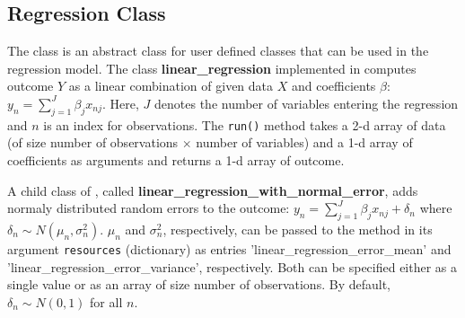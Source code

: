 \subsection{Regression Class}
\label{sec:regression}

The  class is an abstract class for user defined classes
that can be used in the regression model. The class {\bf linear_regression} 
 
implemented in  computes outcome $Y$ as a linear combination of given
data $X$ and coefficients \boldmath $\beta$\unboldmath: $y_n = \sum_{j=1}^J
\beta_j x_{nj}$. Here, $J$ denotes the number of variables entering the
regression and $n$ is an index for observations. The \verb|run()| method takes
a 2-d array of data (of size number of observations $\times$ number of
variables) and a 1-d array of coefficients as arguments and returns a 1-d
array of outcome.

A child class of , called {\bf linear_regression_with_normal_error}, 
adds normaly distributed random errors to the outcome: $y_n = \sum_{j=1}^J \beta_j x_{nj} + \delta_n$ 
where $\delta_n \sim N(\mu_n, \sigma_n^2)$. $\mu_n$ and $\sigma_n^2$, respectively, can be passed 
to the  method in its argument \verb|resources| (dictionary) as entries
'linear_regression_error_mean' and 'linear_regression_error_variance', respectively. Both can be specified either as 
a single value or as an array of size number of observations.
By default, $\delta_n \sim N(0, 1)$ for all $n$.


